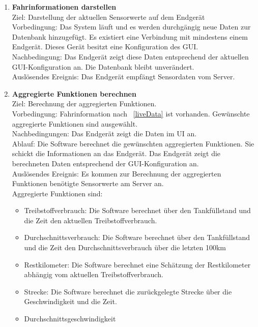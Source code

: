 \documentclass[pflichtenheft.tex]{subfiles}
\begin{document}
	\begin{enumerate}

	\setcounter{enumi}{\value{enumTemp}}


		\item{\textbf{Fahrinformationen darstellen}} \label{liveData} \\ Ziel: Darstellung der aktuellen Sensorwerte auf dem Endgerät \\ Vorbedingung: Das System läuft und es werden durchgängig neue Daten zur Datenbank hinzugefügt. Es existiert eine Verbindung mit mindestens einem Endgerät. Dieses Gerät besitzt eine Konfiguration des GUI.\\ Nachbedingung: Das Endgerät zeigt diese Daten entsprechend der aktuellen GUI-Konfiguration an. Die Datenbank bleibt unverändert. \\ Auslösendes Ereignis: Das Endgerät empfängt Sensordaten vom Server.

		\item{\textbf{Aggregierte Funktionen berechnen}} \\ Ziel: Berechnung der aggregierten Funktionen. \\ Vorbedingung: Fahrinformation nach ~\ref{liveData} ist vorhanden. Gewünschte aggregierte Funktionen sind ausgewählt.\\ Nachbedingungen: Das Endgerät zeigt die Daten im UI an.\\ Ablauf: Die Software berechnet die gewünschten aggregierten Funktionen. Sie schickt die Informationen an das Endgerät. Das Endgerät zeigt die berechneten Daten entsprechend der GUI-Konfiguration an. 
		\\ Auslösendes Ereignis: Es kommen zur Berechnung der aggregierten Funktionen benötigte Sensorwerte am Server an.\\
		Aggregierte Funktionen sind:
		\begin{itemize}
			\item Treibstoffverbrauch: Die Software berechnet über den Tankfüllstand und die Zeit den aktuellen Treibstoffverbrauch.
			\item Durchschnittsverbrauch: Die Software berechnet über den Tankfüllstand und die Zeit den Durchschnittsverbrauch über die letzten 100km
			\item Restkilometer: Die Software berechnet eine Schätzung der Restkilometer abhängig vom aktuellen Treibstoffverbrauch.
			\item Strecke: Die Software berechnet die zurückgelegte Strecke über die Geschwindigkeit und die Zeit.
			\item Durchschnittsgeschwindigkeit
		\end{itemize}


	\setcounter{enumTemp}{\value{enumi}}
	\end{enumerate}
\end{document}
